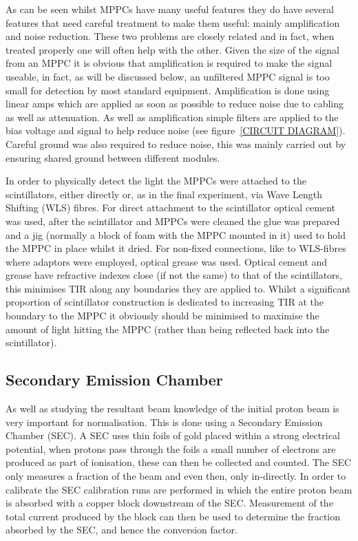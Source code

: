 As can be seen whilst MPPCs have many useful features they do have several features that need careful treatment to make them useful: mainly amplification and noise reduction. These two problems are closely related and in fact, when treated properly one will often help with the other. Given the size of the signal from an MPPC it is obvious that amplification is required to make the signal useable, in fact, as will be discussed below, an unfiltered MPPC signal is too small for detection by most standard equipment. Amplification is done using linear amps which are applied as soon as possible to reduce noise due to cabling as well as attenuation. As well as amplification simple filters are applied to the bias voltage and signal to help reduce noise (see figure~\ref{CIRCUIT DIAGRAM}). Careful ground was also required to reduce noise, this was mainly carried out by ensuring shared ground between different modules.

In order to physically detect the light the MPPCs were attached to the scintillators, either directly or, as in the final experiment, via Wave Length Shifting (WLS) fibres. For direct attachment to the scintillator optical cement was used, after the scintillator and MPPCs were cleaned the glue was prepared and a jig (normally a block of foam with the MPPC mounted in it) used to hold the MPPC in place whilst it dried. For non-fixed connections, like to WLS-fibres where adaptors were employed, optical grease was used. Optical cement and grease have refractive indexes close (if not the same) to that of the scintillators, this minimises TIR along any boundaries they are applied to. Whilst a significant proportion of scintillator construction is dedicated to increasing TIR at the boundary to the MPPC it obviously should be minimised to maximise the amount of light hitting the MPPC (rather than being reflected back into the scintillator).

\subsection{Secondary Emission Chamber} %
\label{sub:secondary_emission_chamber}
As well as studying the resultant beam knowledge of the initial proton beam is very important for normalisation. This is done using a Secondary Emission Chamber (SEC). A SEC uses thin foils of gold placed within a strong electrical potential, when protons pass through the foils a small number of electrons are produced as part of ionisation, these can then be collected and counted. The SEC only measures a fraction of the beam and even then, only in-directly. In order to calibrate the SEC calibration runs are performed in which the entire proton beam is absorbed with a copper block downstream of the SEC. Measurement of the total current produced by the block can then be used to determine the fraction absorbed by the SEC, and hence the conversion factor. 

